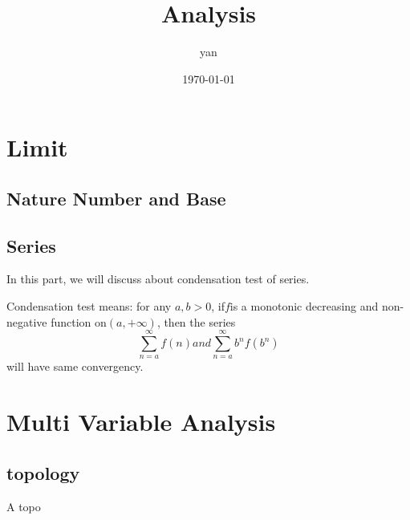 \documentclass{book}
\title{Analysis}
\author{yan}
\date{\today}
\begin{document}
\frontmatter
\maketitle
\tableofcontents

\mainmatter
\part{Limit}
\chapter{Nature Number and Base}
\chapter{Series}

In this part, we will discuss about condensation test of series.

Condensation test means: for any $a, b > 0$, if$f$is a monotonic decreasing and non-negative function on$(a,+\infty)$, then the series
\begin{equation}
\sum_{n=a}^{\infty} f(n) and \sum_{n=a}^{\infty} b^nf(b^n)
\end{equation}
will have same convergency.

\part{Multi Variable Analysis}
\chapter{topology}
A topo
\end{document}
